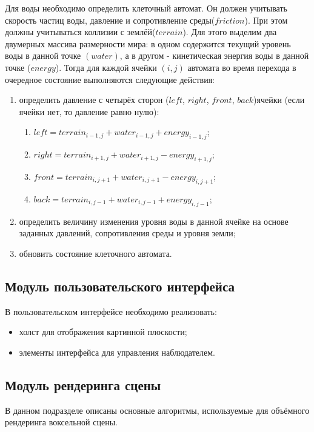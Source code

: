 Для воды необходимо определить клеточный автомат. Он должен учитывать скорость частиц воды,
давление и сопротивление среды($friction$). При этом должны учитываться коллизии с землёй($terrain$). Для этого выделим два двумерных массива размерности мира: в одном содержится текущий уровень воды в данной точке $(water)$, а в другом - кинетическая энергия воды в данной точке ($energy$). Тогда для каждой ячейки $(i, j)$ автомата во время перехода в очередное состояние выполняются следующие действия:
\begin{enumerate}
    \item определить давление с четырёх сторон ($left$, $right$, $front$, $back$)ячейки (если ячейки нет, то давление равно нулю):
    \begin{enumerate}
        \item $left = terrain_{i-1, j} + water_{i-1, j} + energy_{i-1, j}$;
        \item $right = terrain_{i+1, j} + water_{i+1, j} - energy_{i+1, j}$;
        \item $front = terrain_{i, j+1} + water_{i, j+1} - energy_{i, j+1}$;
        \item $back = terrain_{i, j-1} + water_{i, j-1} + energy_{i, j-1}$;
    \end{enumerate}
    \item определить величину изменения уровня воды в данной ячейке на основе заданных давлений,
    сопротивления среды и уровня земли;
    \item обновить состояние клеточного автомата.
\end{enumerate}

\subsection{Модуль пользовательского интерфейса}

В пользовательском интерфейсе необходимо реализовать:
\begin{itemize}
    \item холст для отображения картинной плоскости;
    \item элементы интерфейса для управления наблюдателем.
\end{itemize}

\subsection{Модуль рендеринга сцены}

В данном подразделе описаны основные алгоритмы, используемые для объёмного рендеринга
воксельной сцены.

